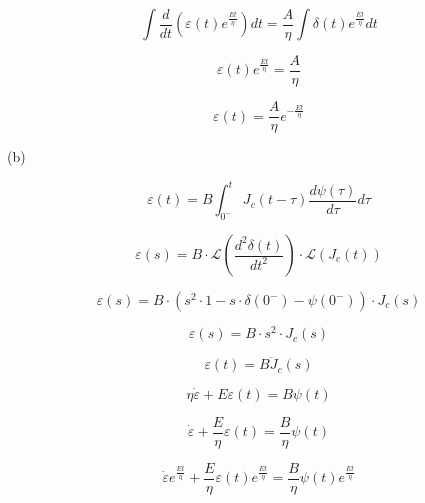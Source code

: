 \documentclass{article}
\begin{document}
\begin{equation*}
    \int \frac{d}{dt} (\varepsilon(t) e^\frac{Et}{\eta}) dt = \frac{A}{\eta} \int \delta(t) e^\frac{Et}{\eta} dt
\end{equation*}

\begin{equation*}
    \varepsilon(t) e^\frac{Et}{\eta} = \frac{A}{\eta}
\end{equation*}

\begin{equation*}
    \varepsilon(t) = \frac{A}{\eta} e^{-\frac{Et}{\eta}}
\end{equation*}

\newpage


(b)

\begin{equation*}
    \varepsilon(t) = B \int_{0^-}^{t} J_c(t-\tau) \frac{d\psi(\tau)}{d\tau} d\tau
\end{equation*}

\begin{equation*}
    \varepsilon(s) = B \cdot \mathcal{L}(\frac{d^2\delta(t)}{dt^2}) \cdot \mathcal{L}(J_c(t)) 
\end{equation*}

\begin{equation*}
    \varepsilon(s) = B \cdot (s^2 \cdot 1 - s \cdot \delta(0^-) - \psi(0^-)) \cdot J_c(s)
\end{equation*}

\begin{equation*}
    \varepsilon(s) = B \cdot s^2 \cdot J_c(s)
\end{equation*}

\begin{equation*}
    \varepsilon(t) = B \ddot J_c(s)
\end{equation*}

\bigskip

\begin{equation*}
    \eta \dot\varepsilon + E \varepsilon(t) = B \psi(t)
\end{equation*}

\begin{equation*}
    \dot\varepsilon + \frac{E}{\eta} \varepsilon(t) = \frac{B}{\eta} \psi(t)
\end{equation*}

\begin{equation*}
    \dot\varepsilon e^\frac{Et}{\eta} + \frac{E}{\eta} \varepsilon(t) e^\frac{Et}{\eta} = \frac{B}{\eta} \psi(t) e^\frac{Et}{\eta}
\end{equation*}
\end{document}
